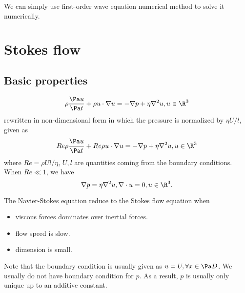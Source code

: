 \begin{refsection}
\begin{remark}
	We can simply use first-order wave equation numerical method to solve it numerically.
\end{remark}

\section{Stokes flow}
\subsection{Basic properties}
\begin{definition}
	$$\rho \frac{\Pa u}{\Pa t} + \rho u\cdot \nabla u  = -\nabla p + \eta \nabla^2 u, u\in\R^3$$
	rewritten in non-dimensional form in which the pressure is normalized by $\eta U/l$, given as
	$$Re\rho \frac{\Pa u}{\Pa t} + Re\rho u\cdot \nabla u  = -\nabla p + \eta \nabla^2 u, u\in\R^3$$
	where $Re = \rho U l /\eta$, $U,l$ are quantities coming from the boundary conditions. 
	When $Re \ll 1$, we have
	$$\nabla p = \eta \nabla^2 u, \nabla \cdot u = 0, u\in \R^3.$$
\end{definition}


\begin{remark}
	The Navier-Stokes equation reduce to the Stokes flow equation when
	\begin{itemize}
		\item viscous forces dominates over inertial forces.
		\item flow speed is slow.
		\item dimension is small. 
	\end{itemize}
\end{remark}


\begin{remark}
	Note that the boundary condition is usually given as $u = U,\forall x\in \Pa D$. We usually do not have boundary condition for $p$. As a result, $p$ is usually only unique up to an additive constant. 
\end{remark}








\end{refsection}
